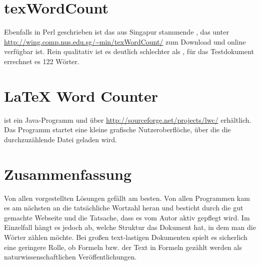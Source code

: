 \documentclass[ngerman]{dtk}
\begin{document}
\section{texWordCount}

Ebenfalls in Perl geschrieben ist das aus Singapur stammende , das unter \url{http://wing.comp.nus.edu.sg/~min/texWordCount/} zum Download und online verfügbar ist. Rein qualitativ ist es deutlich schlechter als , für das Testdokument errechnet es 122 Wörter.

\section{LaTeX Word Counter}

 ist ein Java-Programm und über \url{http://sourceforge.net/projects/lwc/} erhältlich. Das Programm startet eine kleine grafische Nutzeroberflöche, über die die durchzuzählende Datei geladen wird. 

\section{Zusammenfassung}

Von allen vorgestellten Lösungen gefällt  am besten. Von allen Programmen kam es am nächsten an die tatsächliche Wortzahl heran und besticht durch die gut gemachte Webseite und die Tatsache, dass es vom Autor aktiv gepflegt wird. Im Einzelfall hängt es jedoch ab, welche Struktur das Dokument hat, in dem man die Wörter zählen möchte. Bei großen text-lastigen Dokumenten spielt es sicherlich eine geringere Rolle, ob Formeln bzw. der Text in Formeln gezählt werden als naturwissenschaftlichen Veröffentlichungen. 
\end{document}
